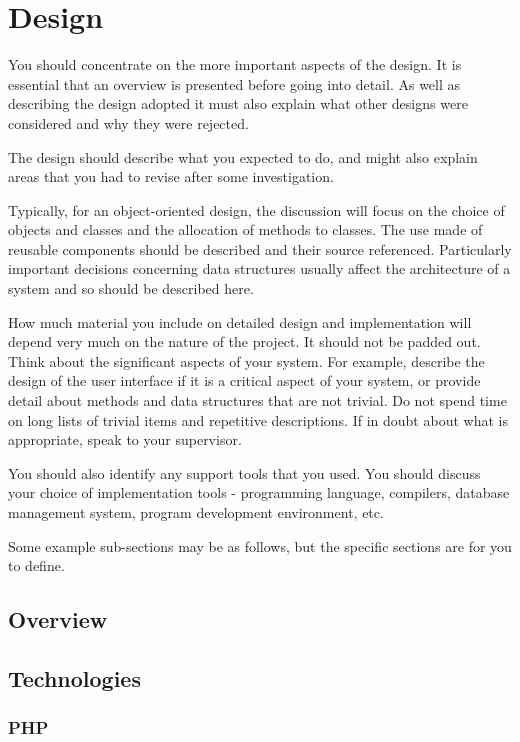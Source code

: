 \chapter{Design}

You should concentrate on the more important aspects of the design. It is essential that an overview is presented before going into detail. As well as describing the design adopted it must also explain what other designs were considered and why they were rejected.

The design should describe what you expected to do, and might also explain areas that you had to revise after some investigation.

Typically, for an object-oriented design, the discussion will focus on the choice of objects and classes and the allocation of methods to classes. The use made of reusable components should be described and their source referenced. Particularly important decisions concerning data structures usually affect the architecture of a system and so should be described here.

How much material you include on detailed design and implementation will depend very much on the nature of the project. It should not be padded out. Think about the significant aspects of your system. For example, describe the design of the user interface if it is a critical aspect of your system, or provide detail about methods and data structures that are not trivial. Do not spend time on long lists of trivial items and repetitive descriptions. If in doubt about what is appropriate, speak to your supervisor.
 
You should also identify any support tools that you used. You should discuss your choice of implementation tools - programming language, compilers, database management system, program development environment, etc.

Some example sub-sections may be as follows, but the specific sections are for you to define. 

\section{Overview}
\section{Technologies}
	\subsection{PHP}
